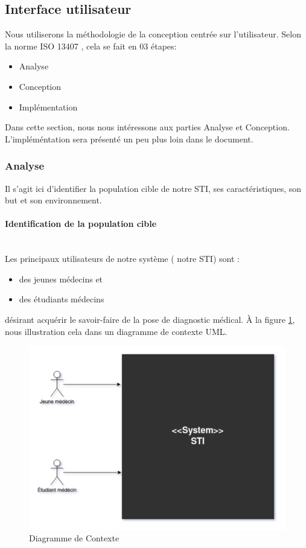     \subsection{Interface utilisateur}
    Nous utiliserons la méthodologie de la conception centrée sur l'utilisateur. Selon la norme ISO 13407 \cite{iso13407}, cela se fait en 03 étapes:
    \begin{itemize}
        \item Analyse
        \item Conception
        \item Implémentation
    \end{itemize}

    Dans cette section, nous nous intéressons aux parties Analyse et Conception. L'impléméntation sera présenté un peu plus loin dans le document.
    
    \subsubsection{Analyse}
    Il s'agit ici d'identifier la population cible de notre STI, ses caractéristiques, son but et son environnement.
    
    \paragraph{Identification de la population cible} \hfill \\
    Les principaux utilisateurs de notre système ( notre STI) sont :
    \begin{itemize}
        \item des jeunes médecins et
        \item des étudiants médecins
    \end{itemize}
    désirant acquérir le savoir-faire de la pose de diagnostic médical.  À la figure \ref{fig:uml_context}, nous illustration cela dans un diagramme de contexte UML.
    
    \begin{figure}[H]
        \centering
        \includegraphics[width=\textwidth]{figures/context.png}
        \captionsetup{justification=centering}
        \caption{Diagramme de Contexte}
        \label{fig:uml_context}
    \end{figure}
    
